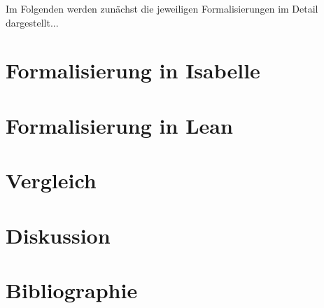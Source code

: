 \documentclass[a4paper,12pt]{scrartcl}
\begin{document}
Im Folgenden werden zunächst die jeweiligen Formalisierungen im Detail dargestellt...
 
\section{Formalisierung in Isabelle}
\section{Formalisierung in Lean}

\section{Vergleich}
\section{Diskussion}
\section{Bibliographie}
\end{document}
